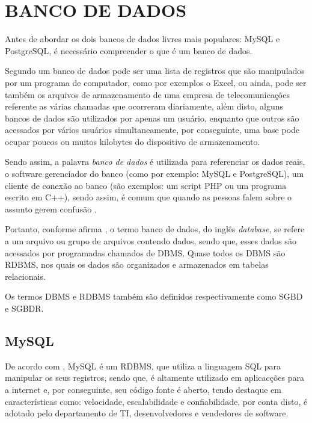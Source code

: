 \section{BANCO DE DADOS}

Antes de abordar os dois bancos de dados livres mais populares:
\acs{MySQL} e \acs{PostgreSQL}, é necessário compreender o que é um banco de
dados.
 
Segundo  um banco de dados pode ser uma
lista de registros que são manipulados por um programa de computador, como por
exemplos o \acs{Excel}, ou ainda, pode ser também os arquivos de armazenamento
de uma empresa de telecomunicações referente as várias chamadas que ocorreram
diariamente, além disto, alguns bancos de dados são utilizados por apenas um
usuário, enquanto que outros são acessados por vários usuários
simultaneamente, por conseguinte, uma base pode ocupar poucos ou muitos
kilobytes do dispositivo de armazenamento.

Sendo assim, a palavra \textit{banco de dados} é utilizada para referenciar os
dados reais, o software gerenciador do banco (como por exemplo: \acs{MySQL} e 
\acs{PostgreSQL}), um cliente de conexão ao banco (são exemplos: um script
\acs{PHP} ou um programa escrito em C++), sendo assim, é comum que quando as 
pessoas falem sobre o assunto gerem confusão \cite{theDefinitiveGuideToMySQL5}.

Portanto, conforme afirma , o termo banco de
dados, do inglês \textit{database}, se refere a um arquivo ou grupo de arquivos contendo dados, 
sendo que, esses dados são acessados por programadas chamados de \ac{DBMS}.
Quase todos os \acs{DBMS} são \ac{RDBMS}, nos quais
os dados são organizados e armazenados em tabelas relacionais.

Os termos \acs{DBMS} e \acs{RDBMS} também são definidos respectivamente como
\ac{SGBD} e \ac{SGBDR}.

\subsection{MySQL}

De acordo com , \acs{MySQL} é um
\acs{RDBMS},  que utiliza a linguagem \ac{SQL} para manipular os seus registros, 
sendo que, é altamente utilizado em aplicacções para a internet e, por
conseguinte,  seu código fonte é aberto, tendo destaque em características
como: velocidade, escalabilidade e confiabilidade, por conta disto, é adotado
pelo departamento de \ac{TI}, desenvolvedores e vendedores de software.

